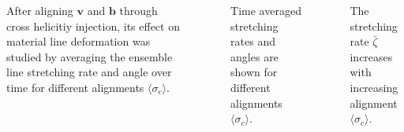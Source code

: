 \documentclass[20pt, a0paper, portrait, margin=15mm, innermargin=15mm,
     blockverticalspace=15mm, colspace=15mm, subcolspace=8mm]{tikzposter} %
\newcommand{\va}[1]{\bm{#1}}
\newcommand{\plot}[3]{
\begin{figure}[H]
    \centering
    \tiny
    \scalebox{1.3}{}
    \caption{\footnotesize{#2}}
    \label{#3}
\end{figure}
}
\begin{document}
\begin{columns}
{\begin{minipage}[t]{20cm}
            \end{minipage}
            \hfill
            \begin{minipage}[t]{20cm}

                    \vspace{0.7cm}

                     After aligning $\va{v}$ and $\va{b}$ through cross helicitiy
                     injection, its effect on material line deformation was
                     studied by averaging the ensemble line stretching
                     rate and angle over time for different alignments $\langle
                     \sigma_c \rangle $.

                    \vspace{0.7cm}

                    \plot{figures/line_xhel_scaling_256}
						{Time averaged stretching rates and angles are shown for
                        different alignments $\langle \sigma_c \rangle$.}
						{xhel_scaling}


                    \begin{itemsposter}
                        \item The stretching rate $\bar{\zeta}$ increases with
                            increasing alignment $\langle \sigma_c \rangle$.



                    \end{itemsposter}


\end{minipage}}
\end{columns}
\end{document}
